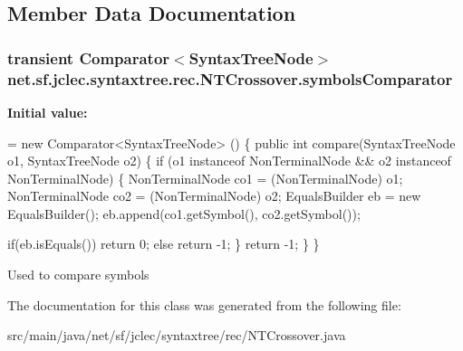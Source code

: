 \subsection{Member Data Documentation}
\hypertarget{classnet_1_1sf_1_1jclec_1_1syntaxtree_1_1rec_1_1_n_t_crossover_accc315cabf9de4cc9ac2dd4d50725187}{
\subsubsection[{symbols\-Comparator}]{\setlength{\rightskip}{0pt plus 5cm}transient Comparator$<${\bf Syntax\-Tree\-Node}$>$ net.\-sf.\-jclec.\-syntaxtree.\-rec.\-N\-T\-Crossover.\-symbols\-Comparator\hspace{0.3cm}{\ttfamily [protected]}}}\label{classnet_1_1sf_1_1jclec_1_1syntaxtree_1_1rec_1_1_n_t_crossover_accc315cabf9de4cc9ac2dd4d50725187}
{\bfseries Initial value\-:}
\begin{DoxyCode}
= \textcolor{keyword}{new} Comparator<SyntaxTreeNode> () 
    \{
        \textcolor{keyword}{public} \textcolor{keywordtype}{int} compare(SyntaxTreeNode o1, SyntaxTreeNode o2) 
        \{           
            \textcolor{keywordflow}{if} (o1 instanceof NonTerminalNode && o2 instanceof NonTerminalNode) \{
                NonTerminalNode co1 = (NonTerminalNode) o1;
                NonTerminalNode co2 = (NonTerminalNode) o2;
                EqualsBuilder eb = \textcolor{keyword}{new} EqualsBuilder();
                eb.append(co1.getSymbol(), co2.getSymbol());
                
                \textcolor{keywordflow}{if}(eb.isEquals())
                    \textcolor{keywordflow}{return} 0;
                \textcolor{keywordflow}{else}
                    \textcolor{keywordflow}{return} -1;
            \}
            \textcolor{keywordflow}{return} -1;
        \}   
    \}
\end{DoxyCode}
Used to compare symbols 

The documentation for this class was generated from the following file\-:\begin{DoxyCompactItemize}
\item 
src/main/java/net/sf/jclec/syntaxtree/rec/N\-T\-Crossover.\-java\end{DoxyCompactItemize}
